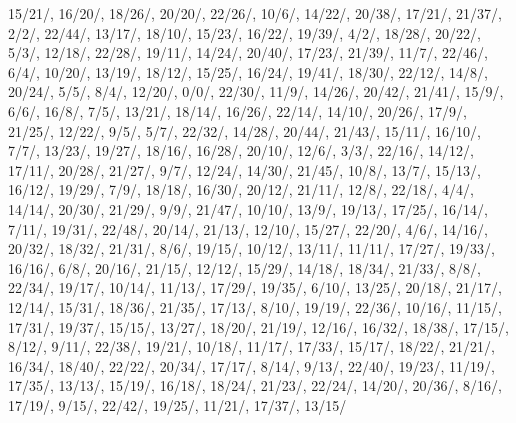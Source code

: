 15/21/{}, 16/20/{}, 18/26/{}, 20/20/{}, 22/26/{}, 10/6/{}, 14/22/{}, 20/38/{}, 17/21/{}, 21/37/{}, 2/2/{}, 22/44/{}, 13/17/{}, 18/10/{}, 15/23/{}, 16/22/{}, 19/39/{}, 4/2/{}, 18/28/{}, 20/22/{}, 5/3/{}, 12/18/{}, 22/28/{}, 19/11/{}, 14/24/{}, 20/40/{}, 17/23/{}, 21/39/{}, 11/7/{}, 22/46/{}, 6/4/{}, 10/20/{}, 13/19/{}, 18/12/{}, 15/25/{}, 16/24/{}, 19/41/{}, 18/30/{}, 22/12/{}, 14/8/{}, 20/24/{}, 5/5/{}, 8/4/{}, 12/20/{}, 0/0/{}, 22/30/{}, 11/9/{}, 14/26/{}, 20/42/{}, 21/41/{}, 15/9/{}, 6/6/{}, 16/8/{}, 7/5/{}, 13/21/{}, 18/14/{}, 16/26/{}, 22/14/{}, 14/10/{}, 20/26/{}, 17/9/{}, 21/25/{}, 12/22/{}, 9/5/{}, 5/7/{}, 22/32/{}, 14/28/{}, 20/44/{}, 21/43/{}, 15/11/{}, 16/10/{}, 7/7/{}, 13/23/{}, 19/27/{}, 18/16/{}, 16/28/{}, 20/10/{}, 12/6/{}, 3/3/{}, 22/16/{}, 14/12/{}, 17/11/{}, 20/28/{}, 21/27/{}, 9/7/{}, 12/24/{}, 14/30/{}, 21/45/{}, 10/8/{}, 13/7/{}, 15/13/{}, 16/12/{}, 19/29/{}, 7/9/{}, 18/18/{}, 16/30/{}, 20/12/{}, 21/11/{}, 12/8/{}, 22/18/{}, 4/4/{}, 14/14/{}, 20/30/{}, 21/29/{}, 9/9/{}, 21/47/{}, 10/10/{}, 13/9/{}, 19/13/{}, 17/25/{}, 16/14/{}, 7/11/{}, 19/31/{}, 22/48/{}, 20/14/{}, 21/13/{}, 12/10/{}, 15/27/{}, 22/20/{}, 4/6/{}, 14/16/{}, 20/32/{}, 18/32/{}, 21/31/{}, 8/6/{}, 19/15/{}, 10/12/{}, 13/11/{}, 11/11/{}, 17/27/{}, 19/33/{}, 16/16/{}, 6/8/{}, 20/16/{}, 21/15/{}, 12/12/{}, 15/29/{}, 14/18/{}, 18/34/{}, 21/33/{}, 8/8/{}, 22/34/{}, 19/17/{}, 10/14/{}, 11/13/{}, 17/29/{}, 19/35/{}, 6/10/{}, 13/25/{}, 20/18/{}, 21/17/{}, 12/14/{}, 15/31/{}, 18/36/{}, 21/35/{}, 17/13/{}, 8/10/{}, 19/19/{}, 22/36/{}, 10/16/{}, 11/15/{}, 17/31/{}, 19/37/{}, 15/15/{}, 13/27/{}, 18/20/{}, 21/19/{}, 12/16/{}, 16/32/{}, 18/38/{}, 17/15/{}, 8/12/{}, 9/11/{}, 22/38/{}, 19/21/{}, 10/18/{}, 11/17/{}, 17/33/{}, 15/17/{}, 18/22/{}, 21/21/{}, 16/34/{}, 18/40/{}, 22/22/{}, 20/34/{}, 17/17/{}, 8/14/{}, 9/13/{}, 22/40/{}, 19/23/{}, 11/19/{}, 17/35/{}, 13/13/{}, 15/19/{}, 16/18/{}, 18/24/{}, 21/23/{}, 22/24/{}, 14/20/{}, 20/36/{}, 8/16/{}, 17/19/{}, 9/15/{}, 22/42/{}, 19/25/{}, 11/21/{}, 17/37/{}, 13/15/{}